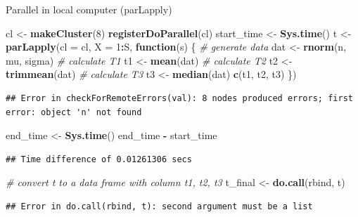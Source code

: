 \documentclass[
  ignorenonframetext,
]{beamer}
\newenvironment{Shaded}{\begin{snugshade}}{\end{snugshade}}
\newcommand{\AttributeTok}[1]{\textcolor[rgb]{0.13,0.29,0.53}{#1}}
\newcommand{\CommentTok}[1]{\textcolor[rgb]{0.56,0.35,0.01}{\textit{#1}}}
\newcommand{\ControlFlowTok}[1]{\textcolor[rgb]{0.13,0.29,0.53}{\textbf{#1}}}
\newcommand{\DecValTok}[1]{\textcolor[rgb]{0.00,0.00,0.81}{#1}}
\newcommand{\FunctionTok}[1]{\textcolor[rgb]{0.13,0.29,0.53}{\textbf{#1}}}
\newcommand{\NormalTok}[1]{#1}
\newcommand{\OtherTok}[1]{\textcolor[rgb]{0.56,0.35,0.01}{#1}}
\newcommand{\SpecialCharTok}[1]{\textcolor[rgb]{0.81,0.36,0.00}{\textbf{#1}}}
\begin{document}
\begin{frame}[fragile]{Parallel in local computer (parLapply)}
\protect{}\label{parallel-in-local-computer-parlapply}
\tiny

\begin{Shaded}
\begin{Highlighting}[]
\NormalTok{cl }\OtherTok{\textless{}{-}} \FunctionTok{makeCluster}\NormalTok{(}\DecValTok{8}\NormalTok{)}
\FunctionTok{registerDoParallel}\NormalTok{(cl)}
\NormalTok{start\_time }\OtherTok{\textless{}{-}} \FunctionTok{Sys.time}\NormalTok{()}
\NormalTok{t }\OtherTok{\textless{}{-}} \FunctionTok{parLapply}\NormalTok{(}\AttributeTok{cl =}\NormalTok{ cl, }\AttributeTok{X =} \DecValTok{1}\SpecialCharTok{:}\NormalTok{S, }\ControlFlowTok{function}\NormalTok{(s) \{}
  \CommentTok{\# generate data}
\NormalTok{  dat }\OtherTok{\textless{}{-}} \FunctionTok{rnorm}\NormalTok{(n, mu, sigma)}
  \CommentTok{\# calculate T1}
\NormalTok{  t1 }\OtherTok{\textless{}{-}} \FunctionTok{mean}\NormalTok{(dat)}
  \CommentTok{\# calculate T2}
\NormalTok{  t2 }\OtherTok{\textless{}{-}} \FunctionTok{trimmean}\NormalTok{(dat)}
  \CommentTok{\# calculate T3}
\NormalTok{  t3 }\OtherTok{\textless{}{-}} \FunctionTok{median}\NormalTok{(dat)}
  \FunctionTok{c}\NormalTok{(t1, t2, t3)}
\NormalTok{\})}
\end{Highlighting}
\end{Shaded}

\begin{verbatim}
## Error in checkForRemoteErrors(val): 8 nodes produced errors; first error: object 'n' not found
\end{verbatim}

\begin{Shaded}
\begin{Highlighting}[]
\NormalTok{end\_time }\OtherTok{\textless{}{-}} \FunctionTok{Sys.time}\NormalTok{()}
\NormalTok{end\_time }\SpecialCharTok{{-}}\NormalTok{ start\_time}
\end{Highlighting}
\end{Shaded}

\begin{verbatim}
## Time difference of 0.01261306 secs
\end{verbatim}

\begin{Shaded}
\begin{Highlighting}[]
\CommentTok{\# convert t to a data frame with column t1, t2, t3}
\NormalTok{t\_final }\OtherTok{\textless{}{-}} \FunctionTok{do.call}\NormalTok{(rbind, t)}
\end{Highlighting}
\end{Shaded}

\begin{verbatim}
## Error in do.call(rbind, t): second argument must be a list
\end{verbatim}
\end{frame}
\end{document}
